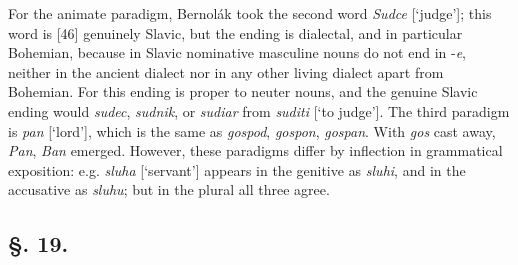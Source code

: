 For the animate paradigm, Bernolák took the second word \textit{Sudce} [‘judge’]; this word is [46] genuinely Slavic, but the ending is dialectal, and in particular Bohemian, because in Slavic nominative masculine nouns do not end in -\textit{e}, neither in the ancient dialect nor in any other living dialect apart from Bohemian. For this ending is proper to neuter nouns, and the genuine Slavic ending would \textit{sudec}, \textit{sudnik}, or \textit{sudiar} from \textit{suditi} [‘to judge’]. The third paradigm is \textit{pan} [‘lord’], which is the same as \textit{gospod}, \textit{gospon}, \textit{gospan}. With \textit{gos} cast away, \textit{Pan}, \textit{Ban} emerged. However, these paradigms differ by inflection in grammatical exposition: e.g. \textit{sluha} [‘servant’] appears in the genitive as \textit{sluhi}, and in the accusative as \textit{sluhu}; but in the plural all three agree.

\subsection*{\hspace*{\fill}§. 19.\hspace*{\fill}}

